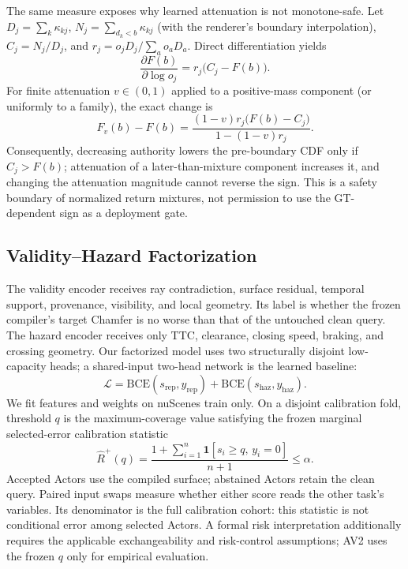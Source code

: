 The same measure exposes why learned attenuation is not monotone-safe. Let $D_j=\sum_k\kappa_{kj}$,
$N_j=\sum_{d_k<b}\kappa_{kj}$ (with the renderer's boundary interpolation), $C_j=N_j/D_j$, and
$r_j=o_jD_j/\sum_a o_aD_a$. Direct differentiation yields
\begin{equation}
\frac{\partial F(b)}{\partial\log o_j}=r_j\bigl(C_j-F(b)\bigr).
\label{eq:attenuation-sign-boundary}
\end{equation}
For finite attenuation $v\in(0,1)$ applied to a positive-mass component (or uniformly to a family), the exact
change is
\begin{equation}
F_v(b)-F(b)=\frac{(1-v)r_j\bigl(F(b)-C_j\bigr)}{1-(1-v)r_j}.
\label{eq:finite-attenuation-boundary}
\end{equation}
Consequently, decreasing authority lowers the pre-boundary CDF only if $C_j>F(b)$; attenuation of a later-than-mixture
component increases it, and changing the attenuation magnitude cannot reverse the sign. This is a safety boundary of
normalized return mixtures, not permission to use the GT-dependent sign as a deployment gate.

\subsection{Validity--Hazard Factorization}

The validity encoder receives ray contradiction, surface residual, temporal support, provenance, visibility, and local geometry. Its label is whether the frozen compiler's target Chamfer is no worse than that of the untouched clean query. The hazard encoder receives only TTC, clearance, closing speed, braking, and crossing geometry. Our factorized model uses two structurally disjoint low-capacity heads; a shared-input two-head network is the learned baseline:
\begin{equation}
\mathcal{L}=\mathrm{BCE}(s_{\mathrm{rep}},y_{\mathrm{rep}})+\mathrm{BCE}(s_{\mathrm{haz}},y_{\mathrm{haz}}).
\end{equation}
We fit features and weights on nuScenes train only. On a disjoint calibration fold, threshold $q$ is the maximum-coverage value satisfying the frozen marginal selected-error calibration statistic
\begin{equation}
\widehat R^+(q)=\frac{1+\sum_{i=1}^{n}\mathbf{1}[s_i\ge q,\,y_i=0]}{n+1}\le\alpha.
\end{equation}
Accepted Actors use the compiled surface; abstained Actors retain the clean query. Paired input swaps measure whether either score reads the other task's variables. Its denominator is the full calibration cohort: this statistic is not conditional error among selected Actors. A formal risk interpretation additionally requires the applicable exchangeability and risk-control assumptions; AV2 uses the frozen $q$ only for empirical evaluation.

